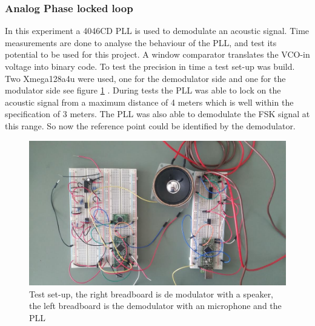 \documentclass[10pt,a4paper]{article}
\begin{document}
\subsubsection{Analog Phase locked loop}
In this experiment a 4046CD PLL is used to demodulate an acoustic signal. Time measurements are done to analyse the behaviour of the PLL, and test its potential to be used for this project. A window comparator translates the VCO-in voltage into binary code. To test the precision in time a test set-up was build. Two Xmega128a4u were used, one for the demodulator side and one for the modulator side see figure \ref{fig:testup} . During tests the PLL was able to lock on the acoustic signal from a maximum distance of 4 meters which is well within the specification of 3 meters.  The PLL was also able to demodulate the FSK signal at this range. So now the reference point could be identified by the demodulator.

\begin{figure}[H]
   \centering
   \includegraphics[width=\textwidth]{testopstelling.jpg}
   \caption{Test set-up, the right breadboard is de modulator with a speaker, the left breadboard is the demodulator with an microphone and the PLL}
   \label{fig:testup}
\end{figure}

\begin{table}[h]
\centering
{}
\caption{Measured times in clock pulses, pre scaler is set to 1024 }
\label{measuretime}
\end{table}
\end{document}
